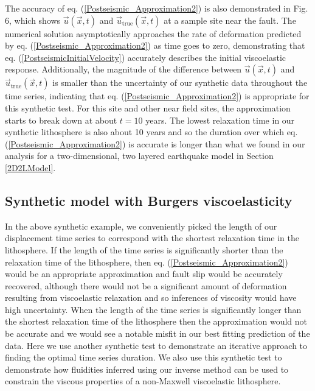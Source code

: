 \documentclass[extra,mreferee]{gji}
\begin{document}
The accuracy of eq. (\ref{Postseismic_Approximation2}) is also
demonstrated in Fig. 6, which shows $\vec{u}(\vec{x},t)$ and
$\vec{u}_{\mathrm{true}}(\vec{x},t)$ at a sample site near the fault.
The numerical solution asymptotically approaches the rate of
deformation predicted by eq. (\ref{Postseismic_Approximation2}) as
time goes to zero, demonstrating that
eq. (\ref{PostseismicInitialVelocity}) accurately describes the
initial viscoelastic response.  Additionally, the magnitude of the
difference between $\vec{u}(\vec{x},t)$ and
$\vec{u}_{\mathrm{true}}(\vec{x},t)$ is smaller than the uncertainty
of our synthetic data throughout the time series, indicating that
eq. (\ref{Postseismic_Approximation2}) is appropriate for this
synthetic test.  For this site and other near field sites, the
approximation starts to break down at about $t=10$ years. The lowest
relaxation time in our synthetic lithosphere is also about 10 years
and so the duration over which eq. (\ref{Postseismic_Approximation2})
is accurate is longer than what we found in our analysis for a
two-dimensional, two layered earthquake model in Section \ref{2D2LModel}.

\subsection{Synthetic model with Burgers viscoelasticity}\label{BurgersModel}
In the above synthetic example, we conveniently picked the length of
our displacement time series to correspond with the shortest
relaxation time in the lithosphere.  If the length of the time series
is significantly shorter than the relaxation time of the lithosphere,
then eq. (\ref{Postseismic_Approximation2}) would be an appropriate 
approximation and fault slip would be accurately recovered, although
there would not be a significant amount of deformation resulting from
viscoelastic relaxation and so inferences of viscosity would have high
uncertainty.  When the length of the time series is significantly
longer than the shortest relaxation time of the lithosphere then the
approximation would not be accurate and we would see a notable misfit
in our best fitting prediction of the data. Here we use another
synthetic test to demonstrate an iterative approach to finding the
optimal time series duration. We also use this synthetic test to
demonstrate how fluidities inferred using our inverse method can be
used to constrain the viscous properties of a non-Maxwell viscoelastic
lithosphere.
\end{document}
